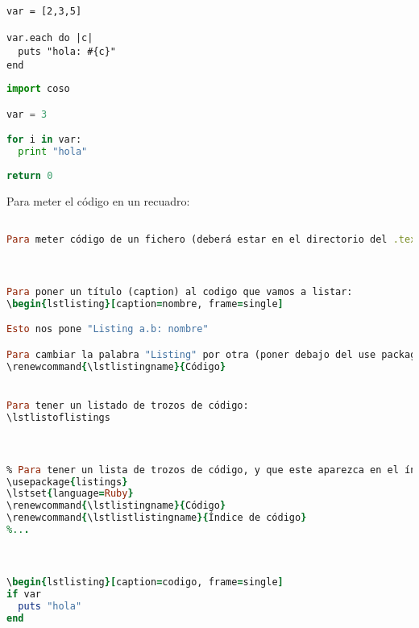 
\usepackage{listings}
\lstset{language=Ruby} %

\begin{lstlisting}
var = [2,3,5]

var.each do |c|
  puts "hola: #{c}"
end
\end{lstlisting}

\begin{lstlisting}[language=Python]
import coso

var = 3

for i in var:
  print "hola"
  
return 0
\end{lstlisting}


Para meter el código en un recuadro:
\begin{lstlisting}[language=Ruby,frame=single]

Para meter código de un fichero (deberá estar en el directorio del .tex):



Para poner un título (caption) al codigo que vamos a listar:
\begin{lstlisting}[caption=nombre, frame=single]

Esto nos pone "Listing a.b: nombre"

Para cambiar la palabra "Listing" por otra (poner debajo del use package):
\renewcommand{\lstlistingname}{Código}


Para tener un listado de trozos de código:
\lstlistoflistings



% Para tener un lista de trozos de código, y que este aparezca en el índice, deberíamos tener:
\usepackage{listings}
\lstset{language=Ruby}
\renewcommand{\lstlistingname}{Código}
\renewcommand{\lstlistlistingname}{Índice de código}
%...



\begin{lstlisting}[caption=codigo, frame=single]
if var
  puts "hola"
end
\end{lstlisting}

\lstlistoflistings

